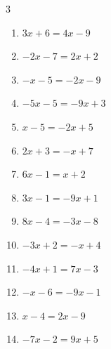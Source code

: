 \begin{multicols}{3}
\begin{enumerate}
        \phantom{$\displaystyle x=-5$}

  \item $3x+6=4x-9$

        \phantom{$\displaystyle x=15$}

  \item $-2x-7=2x+2$


  \item $-x-5=-2x-9$

        \phantom{$\displaystyle x=-4$}

  \item $-5x-5=-9x+3$

        \phantom{$\displaystyle x=2$}

  \item $x-5=-2x+5$


  \item $2x+3=-x+7$


  \item $6x-1=x+2$


  \item $3x-1=-9x+1$


  \item $8x-4=-3x-8$


\columnbreak %

  \item $-3x+2=-x+4$

        \phantom{$\displaystyle x=-1$}

  \item $-4x+1=7x-3$


  \item $-x-6=-9x-1$


  \item $x-4=2x-9$

        \phantom{$\displaystyle x=5$}

  \item $-7x-2=9x+5$


\end{enumerate}
\end{multicols}
